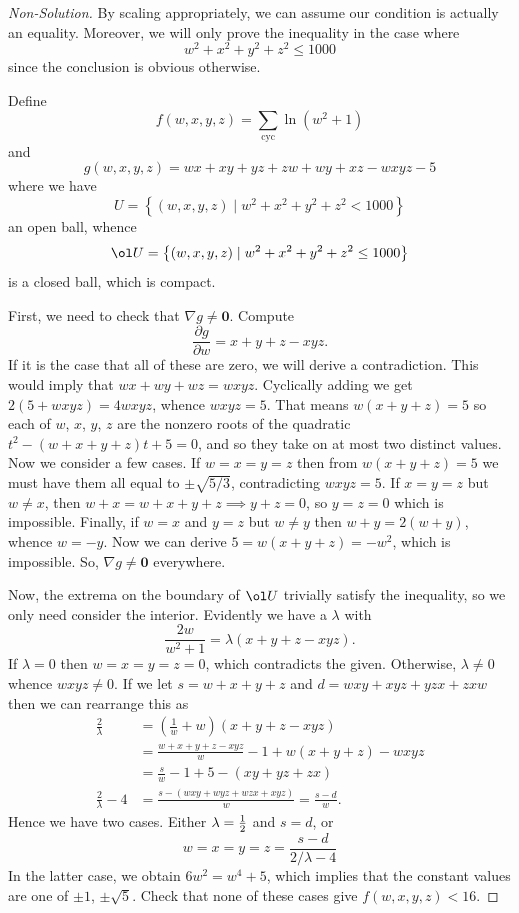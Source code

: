 \documentclass[11pt]{scrartcl}
\begin{document}
\begin{proof}[Non-Solution]
  By scaling appropriately, we can assume our condition is actually an equality.
  Moreover, we will only prove the inequality in the case where
  \[ w^2+x^2+y^2+z^2 \le 1000 \]
  since the conclusion is obvious otherwise.

  Define
  \[ f(w,x,y,z) = \sum_{\text{cyc}} \ln (w^2+1) \]
  and
  \[ g(w,x,y,z) = wx+xy+yz+zw+wy+xz-wxyz-5 \]
  where we have
  \[ U = \left\{ (w,x,y,z) \mid w^2+x^2+y^2+z^2 < 1000 \right\} \]
  an open ball, whence
  \[ \ol U = \left\{ (w,x,y,z) \mid w^2+x^2+y^2+z^2 \le 1000 \right\} \]
  is a closed ball, which is compact.

  First, we need to check that $\nabla g \neq \mathbf{0}$. Compute
  \[ \frac{\partial g}{\partial w} = x+y+z - xyz. \]
  If it is the case that all of these are zero, we will derive a contradiction.
  This would imply that $wx+wy+wz = wxyz$.
  Cyclically adding we get $2(5+wxyz) = 4wxyz$, whence $wxyz = 5$.
  That means $w(x+y+z) = 5$
  so each of $w$, $x$, $y$, $z$ are the nonzero roots of the quadratic $t^2-(w+x+y+z)t+5 = 0$,
  and so they take on at most two distinct values.
  Now we consider a few cases. If $w=x=y=z$ then from $w(x+y+z) = 5$
  we must have them all equal to $\pm \sqrt{5/3}$, contradicting $wxyz=5$.
  If $x=y=z$ but $w \neq x$, then $w+x=w+x+y+z \implies y+z = 0$, so $y=z=0$ which is impossible.
  Finally, if $w=x$ and $y=z$ but $w \neq y$ then $w+y=2(w+y)$, whence $w=-y$.
  Now we can derive $5=w(x+y+z)=-w^2$, which is impossible.
  So, $\nabla g \neq \mathbf{0}$ everywhere.

  Now, the extrema on the boundary of $\ol U$ trivially satisfy the inequality,
  so we only need consider the interior.
  Evidently we have a $\lambda$ with
  \[ \frac{2w}{w^2+1} = \lambda (x+y+z-xyz). \]
  If $\lambda = 0$ then $w=x=y=z=0$, which contradicts the given.
  Otherwise, $\lambda \neq 0$ whence $wxyz \neq 0$.
  If we let $s = w+x+y+z$ and $d = wxy+xyz+yzx+zxw$ then we can rearrange this as
  \begin{align*}
    \frac{2}{\lambda} &= \left( \frac 1w+w \right)(x+y+z-xyz) \\
    &= \frac{w+x+y+z-xyz}{w}-1 + w(x+y+z) - wxyz \\
    &= \frac{s}{w} - 1 + 5-(xy+yz+zx) \\
    \frac{2}{\lambda}-4 &= \frac{s - (wxy+wyz+wzx+xyz)}{w} = \frac{s-d}{w}.
  \end{align*}
  Hence we have two cases. Either $\lambda = \frac{1}{2}$ and $s = d$, or
  \[ w = x = y = z = \frac{s-d}{2/\lambda - 4} \]
  In the latter case, we obtain $6w^2 = w^4+5$,
  which implies that the constant values are one of $\pm 1$, $\pm \sqrt{5}$.
  Check that none of these cases give $f(w,x,y,z) < 16$.


\end{proof}
\end{document}
